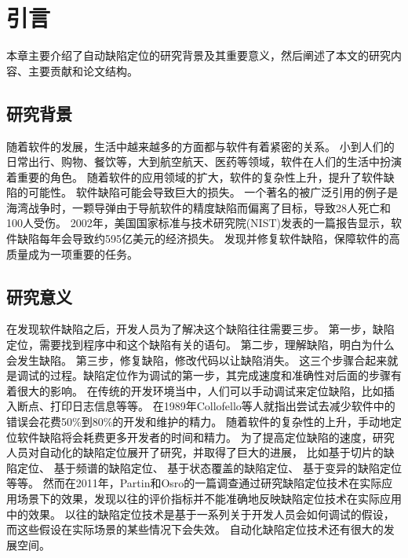 \chapter{引言}

本章主要介绍了自动缺陷定位的研究背景及其重要意义，然后阐述了本文的研究内容、主要贡献和论文结构。

\section{研究背景}

随着软件的发展，生活中越来越多的方面都与软件有着紧密的关系。
小到人们的日常出行、购物、餐饮等，大到航空航天、医药等领域，软件在人们的生活中扮演着重要的角色。
随着软件的应用领域的扩大，软件的复杂性上升，提升了软件缺陷的可能性。
软件缺陷可能会导致巨大的损失。
一个著名的被广泛引用的例子是海湾战争时，一颗导弹由于导航软件的精度缺陷而偏离了目标，导致28人死亡和100人受伤\parencite{Zou2015A}。
2002年，美国国家标准与技术研究院(NIST)发表的一篇报告\parencite{NIST2002The}显示，软件缺陷每年会导致约595亿美元的经济损失。
发现并修复软件缺陷，保障软件的高质量成为一项重要的任务。

\section{研究意义}

在发现软件缺陷之后，开发人员为了解决这个缺陷往往需要三步\parencite{Parnin2011Are}。
第一步，缺陷定位，需要找到程序中和这个缺陷有关的语句。
第二步，理解缺陷，明白为什么会发生缺陷。
第三步，修复缺陷，修改代码以让缺陷消失。
这三个步骤合起来就是调试的过程。缺陷定位作为调试的第一步，其完成速度和准确性对后面的步骤有着很大的影响。
在传统的开发环境当中，人们可以手动调试来定位缺陷，比如插入断点、打印日志信息等等。
在1989年Collofello等人就指出尝试去减少软件中的错误会花费50\%到80\%的开发和维护的精力\parencite{Collofello1989Evaluating}。
随着软件的复杂性的上升，手动地定位软件缺陷将会耗费更多开发者的时间和精力。
为了提高定位缺陷的速度，研究人员对自动化的缺陷定位展开了研究，并取得了巨大的进展，
比如基于切片的缺陷定位\parencite{Weiser1981Program,Weiser1984Program}、
基于频谱的缺陷定位\parencite{Reps1997The,Harrold2000An,Renieres2003Fault,Jones2002Visualization,Abreu2006An}、
基于状态覆盖的缺陷定位\parencite{Liblit2005Scalable,Liu2005SOBER,Le2016A}、
基于变异的缺陷定位\parencite{Papadakis2015Metallaxis,Moon2014Ask}等等。
然而在2011年，Partin和Osro的一篇调查\parencite{Parnin2011Are}通过研究缺陷定位技术在实际应用场景下的效果，发现以往的评价指标并不能准确地反映缺陷定位技术在实际应用中的效果。
以往的缺陷定位技术是基于一系列关于开发人员会如何调试的假设，而这些假设在实际场景的某些情况下会失效。
自动化缺陷定位技术还有很大的发展空间。

